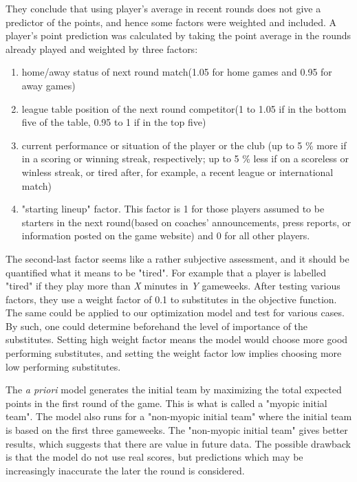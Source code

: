 They conclude that using player's average in recent rounds does not give a predictor of the points, and hence some factors were weighted and included. A player's point prediction was calculated by taking the point average in the rounds already played and weighted by three factors: 
\begin{enumerate}
    \item home/away status of next round match(1.05 for home games and 0.95 for away games) 
    \item league table position of the next round competitor(1 to 1.05 if in the bottom five of the table, 0.95 to 1 if in the top five)
    \item current performance or situation of the player or the club (up to 5 \% more if in a scoring or winning streak, respectively; up to 5 \% less if on a scoreless or winless streak, or tired after, for example, a recent league or international match)
    \item "starting lineup" factor. This factor is 1 for those players assumed to be starters in the next round(based on coaches' announcements, press reports, or information posted on the game website) and 0 for all other players. 
\end{enumerate}

The second-last factor seems like a rather subjective assessment, and it should be quantified what it means to be "tired". For example that a player is labelled "tired" if they play more than \textit{X} minutes in \textit{Y} gameweeks. After testing various factors, they use a weight factor of 0.1 to substitutes in the objective function. The same could be applied to our optimization model and test for various cases. By such, one could determine beforehand the level of importance of the substitutes. Setting high weight factor means the model would choose more good performing substitutes, and setting the weight factor low implies choosing more low performing substitutes.   

\newpar

The \textit{a priori} model generates the initial team by maximizing the total expected points in the first round of the game. This is what is called a "myopic initial team". The model also runs for a "non-myopic initial team" where the initial team is based on the first three gameweeks. The "non-myopic initial team" gives better results, which suggests that there are value in future data. The possible drawback is that the model do not use real scores, but predictions which may be increasingly inaccurate the later the round is considered. 


